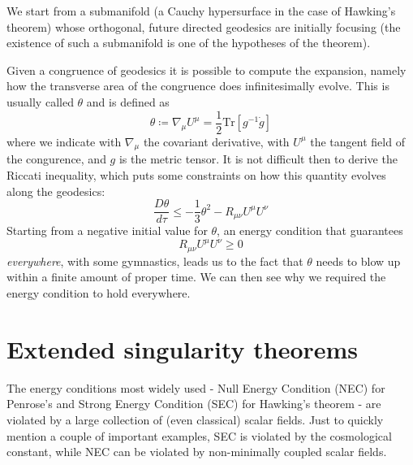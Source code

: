 \documentclass[12pt, a4paper]{article}
\begin{document}
We start from a submanifold (a Cauchy hypersurface in the case of Hawking's theorem) whose orthogonal, future directed geodesics are initially focusing (the existence of such a submanifold is one of the hypotheses of the theorem).

Given a congruence of geodesics it is possible to compute the expansion, namely how the transverse area of the congruence does infinitesimally evolve. This is usually called \(\theta\) and is defined as 
\[
\theta \coloneqq \nabla_{\mu} U^{\mu} = \frac{1}{2} \text{Tr}\left[g^{-1}\dot{g}\right]
\]
where we indicate with \(\nabla_{\mu}\) the covariant derivative, with \(U^{\mu}\) the tangent field of the congurence, and \(g\) is the metric tensor.
It is not difficult then to derive the Riccati inequality, which puts some constraints on how this quantity evolves along the geodesics:
\[
\frac{D\theta }{d\tau} \le -\frac{1}{3} \theta ^2 - R_{\mu\nu}U^{\mu}U^{\nu}
\]
Starting from a negative initial value for \(\theta\), an energy condition that guarantees 
\[
R_{\mu\nu}U^{\mu}U^{\nu} \ge 0
\]
\emph{everywhere}, with some gymnastics, leads us to the fact that \(\theta\) needs to blow up within a finite amount of proper time.
We can then see why we required the energy condition to hold everywhere.

\section{Extended singularity theorems}
The energy conditions most widely used - Null Energy Condition (NEC) for Penrose's and Strong Energy Condition (SEC) for Hawking's theorem - are violated by a large collection of (even classical) scalar fields. 
Just to quickly mention a couple of important examples, SEC is violated by the cosmological constant, while NEC can be violated by non-minimally coupled scalar fields.

%

\end{document}
